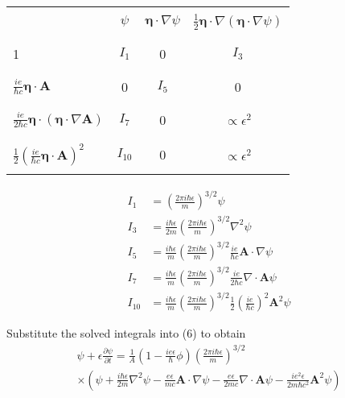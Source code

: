 \documentclass[12pt]{article}
\begin{document}
\begin{center}
\begin{tabular}{|l|c|c|c|}
\hline
& & & \\ %
& $\psi$ & $\boldsymbol\eta\cdot\nabla\psi$ & $\tfrac{1}{2}\boldsymbol\eta\cdot\nabla(\boldsymbol\eta\cdot\nabla\psi)$
\\
& & & \\ %
\hline
& & & \\ %
1 & $I_1$ & 0 & $I_3$
\\
& & & \\ %
\hline
& & &
\\
$\displaystyle\frac{ie}{\hbar c}\boldsymbol\eta\cdot\mathbf A$ & 0 & $I_5$ & 0
\\
& & &
\\
\hline
& & & \\ %
$\displaystyle\frac{ie}{2\hbar c}\boldsymbol\eta\cdot(\boldsymbol\eta\cdot\nabla\mathbf A)$ & $I_7$ & 0 & $\propto\epsilon^2$
\\
& & & \\ %
\hline
& & & \\ %
$\displaystyle\frac{1}{2}\left(\frac{ie}{\hbar c}\boldsymbol\eta\cdot\mathbf A\right)^2$ & $I_{10}$ & 0 & $\propto\epsilon^2$
\\
& & & \\ %
\hline
\end{tabular}
\end{center}

\bigskip
\begin{align*}
I_1&=\left(\frac{2\pi i\hbar\epsilon}{m}\right)^{3/2}\psi
\\
I_3&=\frac{i\hbar\epsilon}{2m}\left(\frac{2\pi i\hbar\epsilon}{m}\right)^{3/2}\nabla^2\psi
\\
I_5&=\frac{i\hbar\epsilon}{m}\left(\frac{2\pi i\hbar\epsilon}{m}\right)^{3/2}
\frac{ie}{\hbar c}\mathbf A\cdot\nabla\psi
\\
I_7&=\frac{i\hbar\epsilon}{m}
\left(\frac{2\pi i\hbar\epsilon}{m}\right)^{3/2}
\frac{ie}{2\hbar c}\nabla\cdot\mathbf A\psi
\\
I_{10}&=\frac{i\hbar\epsilon}{m}
\left(\frac{2\pi i\hbar\epsilon}{m}\right)^{3/2}
\frac{1}{2}
\left(\frac{ie}{\hbar c}\right)^2
\mathbf A^2\psi
\end{align*}

Substitute the solved integrals into (6) to obtain
\begin{multline*}
\psi+\epsilon\frac{\partial\psi}{\partial t}
=\frac{1}{A}
\left(1-\frac{ie\epsilon}{\hbar}\phi\right)\left(\frac{2\pi i\hbar\epsilon}{m}\right)^{3/2}
\\
\times\left(
\psi
+\frac{i\hbar\epsilon}{2m}\nabla^2\psi
-\frac{e\epsilon}{mc}\mathbf A\cdot\nabla\psi
-\frac{e\epsilon}{2mc}\nabla\cdot\mathbf A\psi
-\frac{ie^2\epsilon}{2m\hbar c^2}\mathbf A^2\psi
\right)
\end{multline*}
\end{document}
